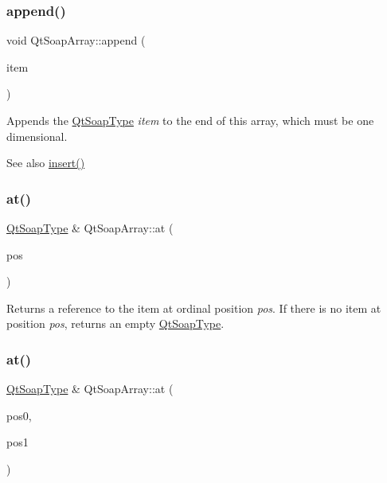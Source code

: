 \subsubsection{\texorpdfstring{append()}{append()}}
{\footnotesize\ttfamily void Qt\+Soap\+Array\+::append (\begin{DoxyParamCaption}\item[{\mbox{\hyperlink{class_qt_soap_type}{Qt\+Soap\+Type}} $\ast$}]{item }\end{DoxyParamCaption})}

Appends the \mbox{\hyperlink{class_qt_soap_type}{Qt\+Soap\+Type}} {\itshape item} to the end of this array, which must be one dimensional.

\begin{DoxySeeAlso}{See also}
\mbox{\hyperlink{class_qt_soap_array_a7be8113dc4c686e1ea243b988269f50d}{insert()}} 
\end{DoxySeeAlso}
\mbox{\label{class_qt_soap_array_a97d6e3695d7cd56dc60c52a492f653a9}} 
\subsubsection{\texorpdfstring{at()}{at()}\hspace{0.1cm}{\footnotesize\ttfamily [1/10]}}
{\footnotesize\ttfamily \mbox{\hyperlink{class_qt_soap_type}{Qt\+Soap\+Type}} \& Qt\+Soap\+Array\+::at (\begin{DoxyParamCaption}\item[{int}]{pos }\end{DoxyParamCaption})}

Returns a reference to the item at ordinal position {\itshape pos}. If there is no item at position {\itshape pos}, returns an empty \mbox{\hyperlink{class_qt_soap_type}{Qt\+Soap\+Type}}. \mbox{\label{class_qt_soap_array_afe1b9a7dc3ebb29e544306af5667e5fa}} 
\subsubsection{\texorpdfstring{at()}{at()}\hspace{0.1cm}{\footnotesize\ttfamily [2/10]}}
{\footnotesize\ttfamily \mbox{\hyperlink{class_qt_soap_type}{Qt\+Soap\+Type}} \& Qt\+Soap\+Array\+::at (\begin{DoxyParamCaption}\item[{int}]{pos0,  }\item[{int}]{pos1 }\end{DoxyParamCaption})}


